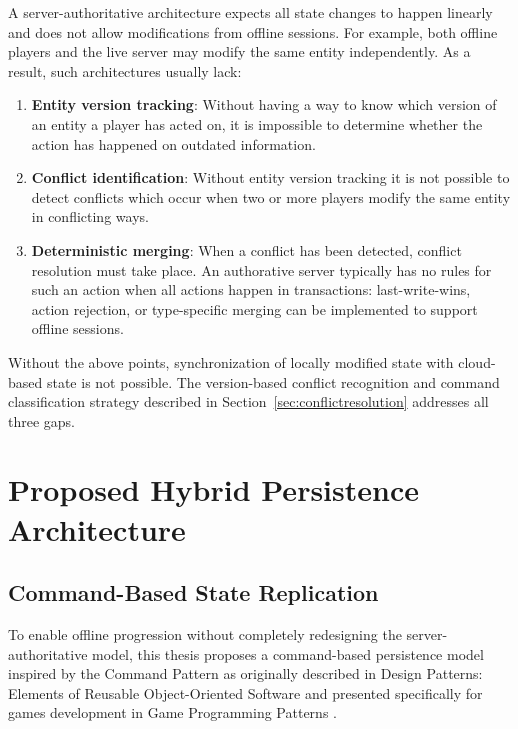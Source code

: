 \documentclass{article}
\begin{document}
A server-authoritative architecture expects all state changes to happen linearly and does not allow modifications from offline sessions. For example, both offline players and the live server may modify the same entity independently. As a result, such architectures usually lack:

\begin{enumerate}
  \item \textbf{Entity version tracking}: Without having a way to know which version of an entity a player has acted on, it is impossible to determine whether the action has happened on outdated information.
  \item \textbf{Conflict identification}: Without entity version tracking it is not possible to detect conflicts which occur when two or more players modify the same entity in conflicting ways.
  \item \textbf{Deterministic merging}: When a conflict has been detected, conflict resolution must take place. An authorative server typically has no rules for such an action when all actions happen in transactions: last-write-wins, action rejection, or type-specific merging can be implemented to support offline sessions.
\end{enumerate}

Without the above points, synchronization of locally modified state with cloud-based state is not possible. The version-based conflict recognition and command classification strategy described in Section~\ref{sec:conflictresolution} addresses all three gaps.

\newpage

\section{Proposed Hybrid Persistence Architecture}
\label{sec:architecture}

\subsection{Command-Based State Replication}
\label{sec:commandbased}

To enable offline progression without completely redesigning the server-authoritative model, this thesis proposes a command-based persistence model inspired by the Command Pattern as originally described in Design Patterns: Elements of Reusable Object-Oriented Software \autocite{gamma1994design} and presented specifically for games development in Game Programming Patterns \autocite{nystrom2014game}.
\end{document}
